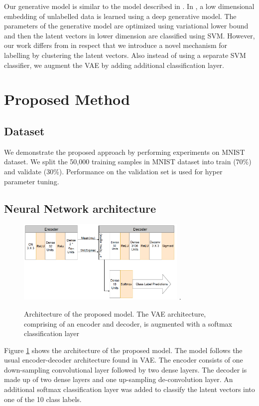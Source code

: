\documentclass[runningheads]{llncs}
\begin{document}
Our generative model is similar to the model described in \cite{kingma_2014}.
In \cite{kingma_2014}, a low dimensional embedding of unlabelled data is learned using a deep generative model.
The parameters of the generative model are optimized using variational lower bound and then the latent vectors in lower dimension are classified using SVM.
However, our work differs from \cite{kingma_2014} in respect that we introduce a novel mechanism for labelling by clustering the latent vectors.
Also instead of using a separate SVM classifier, we augment the VAE by adding additional classification layer.

\section{Proposed Method}

\subsection{Dataset}
We demonstrate the proposed approach by performing experiments on MNIST dataset.
We split the 50,000 training samples in MNIST dataset into  train (70\%) and validate (30\%).
Performance on the validation set is used for hyper parameter tuning.

\subsection{Neural Network architecture}

\begin{figure}[!t]
\centering
\includegraphics[width=3.2in]{vae_arch_v4}
\DeclareGraphicsExtensions.
\caption{Architecture of the proposed model. The VAE architecture, comprising of an encoder and decoder, is augmented with a softmax classification layer}
\label{vae_architecture}
\end{figure}

Figure \ref{vae_architecture} shows the architecture of the proposed model.
The model follows the usual encoder-decoder architecture found in VAE.
The encoder consists of one down-sampling convolutional layer followed by two dense layers.
The decoder is made up of two dense layers and one up-sampling de-convolution layer.
An additional softmax classification layer was added to classify the latent vectors into one of the 10 class labels.
\end{document}
